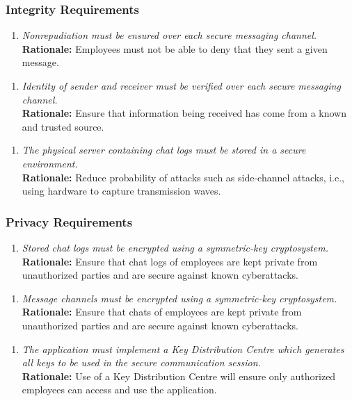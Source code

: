 \documentclass[]{article}
\begin{document}
\begin{enumerate}[{\bf BE1.}]
\subsubsection{Integrity Requirements}
\label{ssub:integrity_requirements}
\begin{enumerate}[{SR-INT}1. ]
    \item \emph{Nonrepudiation must be ensured over each secure messaging channel.}\\
    {\bf Rationale:} Employees must not be able to deny that they sent a given message.
\end{enumerate}
\begin{enumerate}[{SR-INT}2. ]
    \item \emph{Identity of sender and receiver must be verified over each secure messaging channel.}\\
    {\bf Rationale:} Ensure that information being received has come from a known and trusted source.
\end{enumerate}
\begin{enumerate}[{SR-INT}3. ]
    \item \emph{The physical server containing chat logs must be stored in a secure environment.}\\
    {\bf Rationale:} Reduce probability of attacks such as side-channel attacks, i.e., using hardware to capture transmission waves.
\end{enumerate}


\subsubsection{Privacy Requirements}
\label{ssub:privacy_requirements}
\begin{enumerate}[{SR-P}1. ]
    \item \emph{Stored chat logs must be encrypted using a symmetric-key cryptosystem.}\\
    {\bf Rationale:} Ensure that chat logs of employees are kept private from unauthorized parties and are secure against known cyberattacks.
\end{enumerate}
\begin{enumerate}[{SR-P}2. ]
    \item \emph{Message channels must be encrypted using a symmetric-key cryptosystem.}\\
    {\bf Rationale:} Ensure that chats of employees are kept private from unauthorized parties and are secure against known cyberattacks.
\end{enumerate}
\begin{enumerate}[{SR-P}3. ]
    \item \emph{The application must implement a Key Distribution Centre which generates all keys to be used in the secure communication session.}\\
    {\bf Rationale:} Use of a Key Distribution Centre will ensure only authorized employees can access and use the application.
\end{enumerate}



\end{enumerate}
\end{document}
